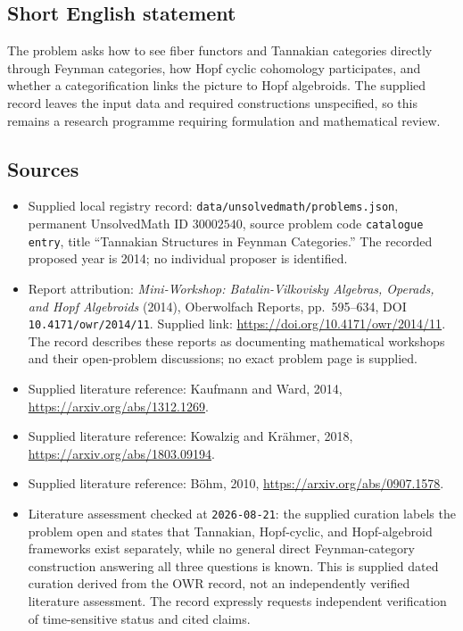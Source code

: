 \documentclass[11pt]{article}
\begin{document}
\subsection{Short English statement}
The problem asks how to see fiber functors and Tannakian categories directly through Feynman categories, how Hopf cyclic cohomology participates, and whether a categorification links the picture to Hopf algebroids. The supplied record leaves the input data and required constructions unspecified, so this remains a research programme requiring formulation and mathematical review.
\subsection{Sources}
\begin{itemize}
\item Supplied local registry record: \texttt{data/unsolvedmath/problems.json}, permanent UnsolvedMath ID \(30002540\), source problem code \texttt{catalogue entry}, title ``Tannakian Structures in Feynman Categories.'' The recorded proposed year is 2014; no individual proposer is identified.
\item Report attribution: \emph{Mini-Workshop: Batalin-Vilkovisky Algebras, Operads, and Hopf Algebroids} (2014), Oberwolfach Reports, pp.\ 595--634, DOI \texttt{10.4171/owr/2014/11}. Supplied link: \url{https://doi.org/10.4171/owr/2014/11}. The record describes these reports as documenting mathematical workshops and their open-problem discussions; no exact problem page is supplied.
\item Supplied literature reference: Kaufmann and Ward, 2014, \url{https://arxiv.org/abs/1312.1269}.
\item Supplied literature reference: Kowalzig and Kr\"ahmer, 2018, \url{https://arxiv.org/abs/1803.09194}.
\item Supplied literature reference: B\"ohm, 2010, \url{https://arxiv.org/abs/0907.1578}.
\item Literature assessment checked at \texttt{2026-08-21}: the supplied curation labels the problem open and states that Tannakian, Hopf-cyclic, and Hopf-algebroid frameworks exist separately, while no general direct Feynman-category construction answering all three questions is known. This is supplied dated curation derived from the OWR record, not an independently verified literature assessment. The record expressly requests independent verification of time-sensitive status and cited claims.
\end{itemize}
\end{document}
